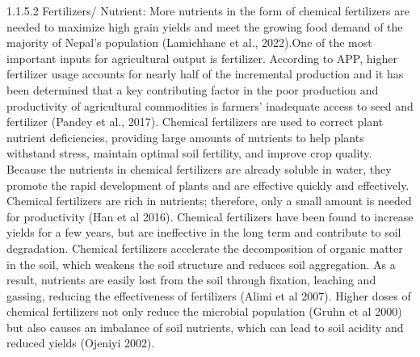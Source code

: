 1.1.5.2 Fertilizers/ Nutrient:
More nutrients in the form of chemical fertilizers are needed to maximize high grain yields and meet the growing food demand of the majority of Nepal's population (Lamichhane et al., 2022).One of the most important inputs for agricultural output is fertilizer. According to APP, higher fertilizer usage accounts for nearly half of the incremental production and it has been determined that a key contributing factor in the poor production and productivity of agricultural commodities is farmers' inadequate access to seed and fertilizer (Pandey et al., 2017). Chemical fertilizers are used to correct plant nutrient deficiencies, providing large amounts of nutrients to help plants withstand stress, maintain optimal soil fertility, and improve crop quality. Because the nutrients in chemical fertilizers are already soluble in water, they promote the rapid development of plants and are effective quickly and effectively. Chemical fertilizers are rich in nutrients; therefore, only a small amount is needed for productivity (Han et al 2016). Chemical fertilizers have been found to increase yields for a few years, but are ineffective in the long term and contribute to soil degradation. Chemical fertilizers accelerate the decomposition of organic matter in the soil, which weakens the soil structure and reduces soil aggregation. As a result, nutrients are easily lost from the soil through fixation, leaching and gassing, reducing the effectiveness of fertilizers (Alimi et al 2007). Higher doses of chemical fertilizers not only reduce the microbial population (Gruhn et al 2000) but also causes an imbalance of soil nutrients, which can lead to soil acidity and reduced yields (Ojeniyi 2002).

